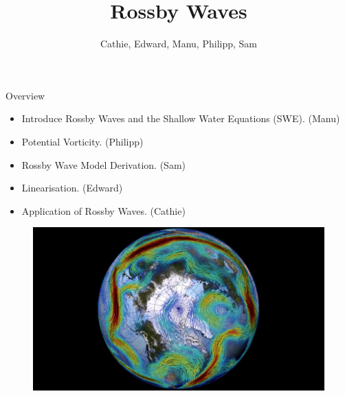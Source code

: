 \documentclass[12pt]{beamer}
\title[Rossby Waves]{Rossby Waves}
\author{Cathie, Edward, Manu, Philipp, Sam}
\institute{University of Reading and Imperial College London}
\begin{document}
	
	\begin{frame}
	\titlepage
\end{frame}

\begin{frame}{Overview}

\begin{itemize}
	\item Introduce Rossby Waves and the Shallow Water Equations (SWE). (Manu)
	\item Potential Vorticity. (Philipp)
	\item Rossby Wave Model Derivation. (Sam)
	\item Linearisation. (Edward)
	\item Application of Rossby Waves. (Cathie)
\end{itemize}

\begin{figure}[H]
	\centering
	\includegraphics[width=0.5\linewidth]{Rossby_Wave.jpg}
\end{figure}   

\end{frame}
\end{document}

